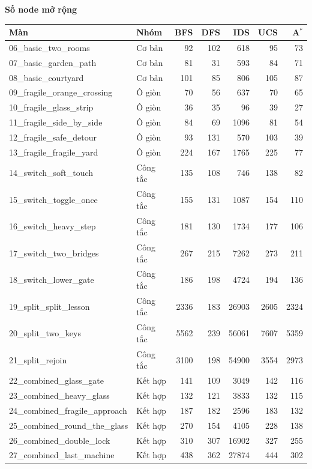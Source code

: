 % 
{\textbf{Số node mở rộng}}\\[0.4em]
\begin{tabular}{llrrrrr}
\hline
Màn & Nhóm & BFS & DFS & IDS & UCS & A$^*$ \\
\hline
06\_basic\_two\_rooms & Cơ bản & 92 & 102 & 618 & 95 & 73 \\
07\_basic\_garden\_path & Cơ bản & 81 & 31 & 593 & 84 & 71 \\
08\_basic\_courtyard & Cơ bản & 101 & 85 & 806 & 105 & 87 \\
09\_fragile\_orange\_crossing & Ô giòn & 70 & 56 & 637 & 70 & 65 \\
10\_fragile\_glass\_strip & Ô giòn & 36 & 35 & 96 & 39 & 27 \\
11\_fragile\_side\_by\_side & Ô giòn & 84 & 69 & 1096 & 81 & 54 \\
12\_fragile\_safe\_detour & Ô giòn & 93 & 131 & 570 & 103 & 39 \\
13\_fragile\_fragile\_yard & Ô giòn & 224 & 167 & 1765 & 225 & 77 \\
14\_switch\_soft\_touch & Công tắc & 135 & 108 & 746 & 138 & 82 \\
15\_switch\_toggle\_once & Công tắc & 155 & 131 & 1087 & 154 & 110 \\
16\_switch\_heavy\_step & Công tắc & 181 & 130 & 1734 & 177 & 106 \\
17\_switch\_two\_bridges & Công tắc & 267 & 215 & 7262 & 273 & 211 \\
18\_switch\_lower\_gate & Công tắc & 186 & 198 & 4724 & 194 & 136 \\
19\_split\_split\_lesson & Công tắc & 2336 & 183 & 26903 & 2605 & 2324 \\
20\_split\_two\_keys & Công tắc & 5562 & 239 & 56061 & 7607 & 5359 \\
21\_split\_rejoin & Công tắc & 3100 & 198 & 54900 & 3554 & 2973 \\
22\_combined\_glass\_gate & Kết hợp & 141 & 109 & 3049 & 142 & 116 \\
23\_combined\_heavy\_glass & Kết hợp & 132 & 121 & 3833 & 132 & 115 \\
24\_combined\_fragile\_approach & Kết hợp & 187 & 182 & 2596 & 183 & 132 \\
25\_combined\_round\_the\_glass & Kết hợp & 270 & 154 & 4105 & 228 & 138 \\
26\_combined\_double\_lock & Kết hợp & 310 & 307 & 16902 & 327 & 255 \\
27\_combined\_last\_machine & Kết hợp & 438 & 362 & 27874 & 444 & 302 \\
\hline
\end{tabular}

